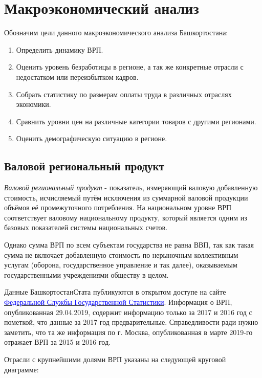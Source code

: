 \section{Макроэкономический анализ}

Обозначим цели данного макроэкономического анализа Башкортостана:
\begin{enumerate}
	\item Определить динамику ВРП.
	\item Оценить уровень безработицы в регионе, а так же конкретные отрасли с недостатком или переизбытком кадров.
	\item Собрать статистику по размерам оплаты труда в различных отраслях экономики.
	\item Сравнить уровни цен на различные категории товаров с другими регионами.
	\item Оценить демографическую ситуацию в регионе.
\end{enumerate}

\subsection{Валовой региональный продукт}
\textit{Валовой региональный продукт} - показатель, измеряющий валовую добавленную стоимость, исчисляемый путём исключения из суммарной валовой продукции объёмов её промежуточного потребления. На национальном уровне ВРП соответствует валовому национальному продукту, который является одним из базовых показателей системы национальных счетов.

Однако сумма ВРП по всем субъектам государства не равна ВВП, так как  такая сумма не включает добавленную стоимость по нерыночным коллективным услугам (оборона, государственное управление и так далее), оказываемым государственными учреждениями обществу в целом.

Данные БашкортостанСтата публикуются в открытом доступе на сайте \href{http://bashstat.gks.ru/wps/wcm/connect/rosstat_ts/bashstat/ru/statistics/}{\textcolor{blue}{Федеральной Службы Государственной Статистики}}. Информация о ВРП, опубликованная 29.04.2019,  содержит информацию только за 2017 и 2016 год с пометкой, что данные за 2017 год предварительные. Справедливости ради нужно заметить, что та же информация по г. Москва, опубликованная в марте 2019-го отражает ВРП за 2015 и 2016 год.

Отрасли с крупнейшими долями ВРП указаны на следующей круговой диаграмме:

